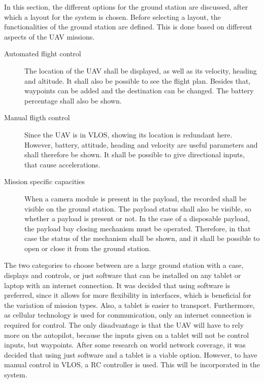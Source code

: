 In this section, the different options for the ground station are discussed, after which a layout for the system is chosen. %
Before selecting a layout, the functionalities of the ground station are defined. This is done based on different aspects of the UAV missions.
\begin{description}
    \item[Automated flight control] The location of the UAV shall be displayed, as well as its velocity, heading and altitude. It shall also be possible to see the flight plan. Besides that, waypoints can be added and the destination can be changed. The battery percentage shall also be shown.  
    \item[Manual fligth control] Since the UAV is in VLOS, showing its location is redundant here. However, battery, attitude, heading and velocity are useful parameters and shall therefore be shown. It shall be possible to give directional inputs, that cause accelerations. 
    \item[Mission specific capacities] When a camera module is present in the payload, the recorded shall be visible on the ground station. The payload status shall also be visible, so whether a payload is present or not. In the case of a disposable payload, the payload bay closing mechanism must be operated. Therefore, in that case the status of the mechanism shall be shown, and it shall be possible to open or close it from the ground station.
\end{description}




The two categories to choose between are a large ground station with a case, displays and controls, or just software that can be installed on any tablet or laptop with an internet connection. It was decided that using software is preferred, since it allows for more flexibility in interfaces, which is beneficial for the variation of mission types. Also, a tablet is easier to transport. Furthermore, as cellular technology is used for communication, only an internet connection is required for control. The only disadvantage is that the UAV will have to rely more on the autopilot, because the inputs given on a tablet will not be control inputs, but waypoints. After some research on world network coverage, it was decided that using just software and a tablet is a viable option\footnotemark. However, to have manual control in VLOS, a RC controller is used. This will be incorporated in the system.



